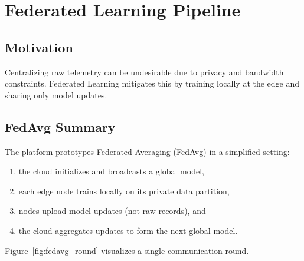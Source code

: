 \section{Federated Learning Pipeline}

\subsection{Motivation}

Centralizing raw telemetry can be undesirable due to privacy and bandwidth constraints. Federated Learning mitigates this by training locally at the edge and sharing only model updates.

\subsection{FedAvg Summary}

The platform prototypes Federated Averaging (FedAvg) \cite{fedavg} in a simplified setting:
\begin{enumerate}
    \item the cloud initializes and broadcasts a global model,
    \item each edge node trains locally on its private data partition,
    \item nodes upload model updates (not raw records), and
    \item the cloud aggregates updates to form the next global model.
\end{enumerate}

Figure~\ref{fig:fedavg_round} visualizes a single communication round.

